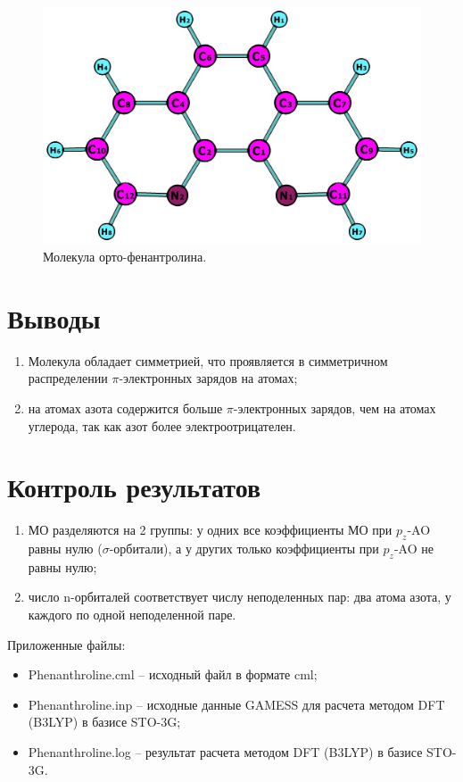 \begin{figure}[H]
\centering
\captionsetup{justification=centering}
\includegraphics[scale=0.4]{fig/1.jpg}
\caption{Молекула орто-фенантролина.}
\label{img:img4}
\end{figure}

\newpage
\section{Выводы}
\begin{enumerate}
    \item Молекула обладает симметрией, что проявляется в симметричном распределении $\pi$-электронных зарядов на атомах;
    \item на атомах азота содержится больше $\pi$-электронных зарядов, чем на атомах углерода, так как азот более электроотрицателен.
\end{enumerate}{}
\newpage
\section{Контроль результатов}
\begin{enumerate}
    \item МО разделяются на 2 группы: у одних все коэффициенты МО при $p_z$-AO равны нулю ($\sigma$-орбитали), а у других только коэффициенты при $p_z$-AO не равны нулю;
    \item число n-орбиталей соответствует числу неподеленных пар: два атома азота, у каждого по одной неподеленной паре.
\end{enumerate}

Приложенные файлы:
\begin{itemize}
    \item Phenanthroline.cml – исходный файл в формате cml;
    \item Phenanthroline.inp – исходные данные GAMESS для расчета методом DFT (B3LYP) в базисе STO-3G;
    \item Phenanthroline.log – результат расчета методом DFT (B3LYP)  в базисе STO-3G.
\end{itemize}{}